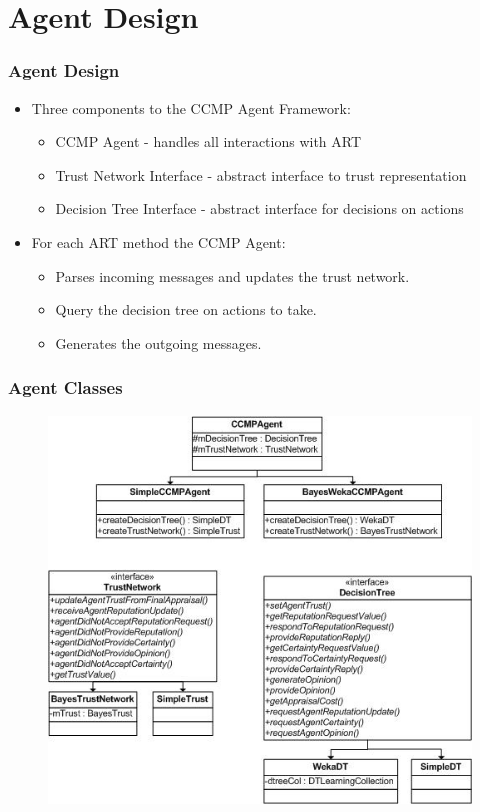 \section{Agent Design}
\begin{frame}
\frametitle{Agent Design}
\begin{itemize}
  \item Three components to the CCMP Agent Framework:
  \begin{itemize}
    \item CCMP Agent - handles all interactions with ART
    \item Trust Network Interface - abstract interface to trust representation
    \item Decision Tree Interface - abstract interface for decisions on actions
  \end{itemize}
\end{itemize}
\begin{itemize}
  \item For each ART method the CCMP Agent:
  \begin{itemize}
    \item Parses incoming messages and updates the trust network.
    \item Query the decision tree on actions to take.
    \item Generates the outgoing messages.
  \end{itemize}
\end{itemize}
\end{frame}

\begin{frame}
\frametitle{Agent Classes}
\begin{figure}
\centering
\includegraphics[height=0.75\textheight]{images/agentClasses.jpg}
\end{figure}
\end{frame}